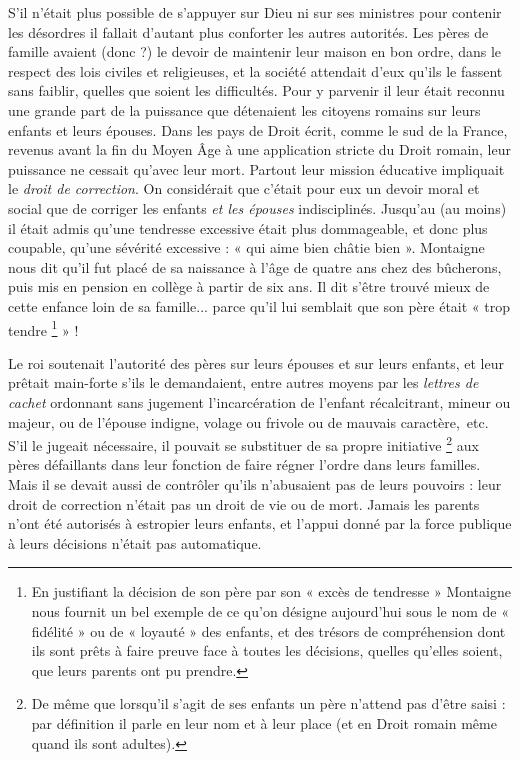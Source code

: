     
    S'il n'était plus possible de s'appuyer sur Dieu ni sur ses ministres pour contenir les désordres il fallait d'autant plus conforter les autres autorités. Les pères de famille avaient (donc ?) le devoir de maintenir leur maison en bon ordre, dans le respect des lois civiles et religieuses, et la société attendait d'eux qu'ils le fassent sans faiblir, quelles que soient les difficultés. Pour y parvenir il leur était reconnu une grande part de la puissance que détenaient les citoyens romains sur leurs enfants et leurs épouses. Dans les pays de Droit écrit, comme le sud de la France, revenus avant la fin du Moyen Âge à une application stricte du Droit romain, leur puissance ne cessait qu'avec leur mort. Partout leur mission éducative impliquait le \emph{droit de correction}. On considérait que c'était pour eux un devoir moral et social que de corriger les enfants \emph{et les épouses} indisciplinés. Jusqu'au  (au moins) il était admis qu'une tendresse excessive était plus dommageable, et donc plus coupable, qu'une sévérité excessive : « {qui aime bien châtie bien} ». Montaigne nous dit qu'il fut placé de sa naissance à l'âge de quatre ans chez des bûcherons, puis mis en pension en collège à partir de six ans. Il dit s'être trouvé mieux de cette enfance loin de sa famille... parce qu'il lui semblait que son père était « trop tendre%
\footnote{En justifiant la décision de son père par son « excès de tendresse » Montaigne nous fournit un bel exemple de ce qu'on désigne aujourd'hui sous le nom de « fidélité » ou de « loyauté » des enfants, et des trésors de compréhension dont ils sont prêts à faire preuve face à toutes les décisions, quelles qu'elles soient, que leurs parents ont pu prendre.} 
» !

 Le roi soutenait l'autorité des pères sur leurs épouses et sur leurs enfants, et leur prêtait main-forte s'ils le demandaient, entre autres moyens par les \emph{lettres de cachet} ordonnant sans jugement l'incarcération de l'enfant récalcitrant, mineur ou majeur, ou de l'épouse indigne, volage ou frivole ou de mauvais caractère,~etc. S'il le jugeait nécessaire, il pouvait se substituer de sa propre initiative%
\footnote{De même que lorsqu'il s'agit de ses enfants un père n'attend pas d'être saisi : par définition il parle en leur nom et à leur place (et en Droit romain même quand ils sont adultes).} 
aux pères défaillants dans leur fonction de faire régner l'ordre dans leurs familles. 
 Mais il se devait aussi de contrôler qu'ils n'abusaient pas de leurs pouvoirs : leur droit de correction n'était pas un droit de vie ou de mort. Jamais les parents n'ont été autorisés à estropier leurs enfants, et l'appui donné par la force publique à leurs décisions n'était pas automatique.

